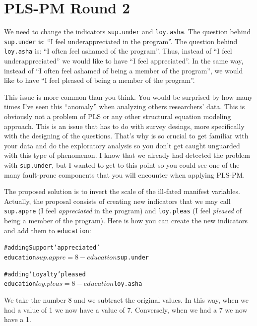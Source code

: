 \documentclass[12pt]{book}\usepackage{graphicx, color}
\makeatletter
\newcommand{\hlcomment}[1]{\textcolor[rgb]{0.180392156862745,0.6,0.341176470588235}{#1}}%
\newenvironment{kframe}{%
 \def\at@end@of@kframe{}%
 \ifinner\ifhmode%
  \def\at@end@of@kframe{\end{minipage}}%
  \begin{minipage}{\columnwidth}%
 \fi\fi%
 \def\FrameCommand##1{\hskip\@totalleftmargin \hskip-\fboxsep
 \colorbox{shadecolor}{##1}\hskip-\fboxsep
     \hskip-\linewidth \hskip-\@totalleftmargin \hskip\columnwidth}%
 \MakeFramed {\advance\hsize-\width
   \@totalleftmargin\z@ \linewidth\hsize
   \@setminipage}}%
 {\par\unskip\endMakeFramed%
 \at@end@of@kframe}
\newenvironment{knitrout}{}{} %
\newcommand{\code}[1]{\texttt{#1}}
\makeatother
\begin{document}
\section{PLS-PM Round 2}
We need to change the indicators \code{sup.under} and \code{loy.asha}. The question behind \code{sup.under} is: ``I feel underappreciated in the program''. The question behind \code{loy.asha} is: ``I often feel ashamed of the program''. Thus, instead of ``I feel underappreciated'' we would like to have ``I feel appreciated''. In the same way, instead of ``I often feel ashamed of being a member of the program'', we would like to have ``I feel pleased of being a member of the program''. 

This issue is more common than you think. You would be surprised by how many times I've seen this ``anomaly'' when analyzing others researchers' data. This is obviously not a problem of PLS or any other structural equation modeling approach. This is an issue that has to do with survey desings, more specifically with the designing of the questions. That's why is so crucial to get familiar with your data and do the exploratory analysis so you don't get caught unguarded with this type of phenomenon. I know that we already had detected the problem with \code{sup.under}, but I wanted to get to this point so you could see one of the many fault-prone components that you will encounter when applying PLS-PM.

The proposed solution is to invert the scale of the ill-fated manifest variables. Actually, the proposal consists of creating new indicators that we may call \code{sup.appre} (I feel \textit{appreciated} in the program) and \code{loy.pleas} (I feel \textit{pleased} of being a member of the program). Here is how you can create the new indicators and add them to \code{education}:
\begin{knitrout}
\color{fgcolor}\begin{kframe}
\begin{alltt}
\hlcomment{# adding Support 'appreciated'}
education$sup.appre = 8 - education$sup.under

\hlcomment{# adding 'Loyalty' pleased}
education$loy.pleas = 8 - education$loy.asha
\end{alltt}
\end{kframe}
\end{knitrout}

We take the number 8 and we subtract the original values. In this way, when we had a value of 1 we now have a value of 7. Conversely, when we had a 7 we now have a 1.
\end{document}
